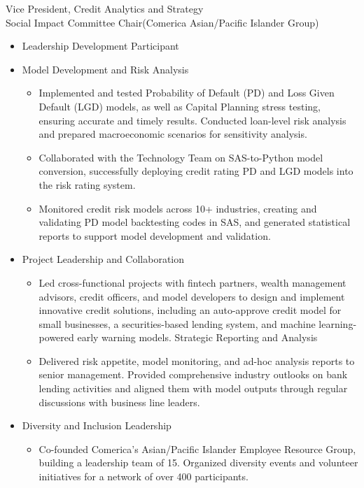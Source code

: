 \documentclass{resume}
\begin{document}
Vice President, Credit Analytics and Strategy\\
Social Impact Committee Chair(Comerica Asian/Pacific Islander Group)
\begin{itemize}

\item Leadership Development Participant
  
\item Model Development and Risk Analysis
  \begin{itemize}
\item Implemented and tested Probability of Default (PD) and Loss Given Default (LGD) models, as well as Capital Planning stress testing, ensuring accurate and timely results. Conducted loan-level risk analysis and prepared macroeconomic scenarios for sensitivity analysis.
\item Collaborated with the Technology Team on SAS-to-Python model conversion, successfully deploying credit rating PD and LGD models into the risk rating system.
\item Monitored credit risk models across 10+ industries, creating and validating PD model backtesting codes in SAS, and generated statistical reports to support model development and validation.
  \end{itemize}
  
\item Project Leadership and Collaboration
  \begin{itemize}
\item Led cross-functional projects with fintech partners, wealth management advisors, credit officers, and model developers to design and implement innovative credit solutions, including an auto-approve credit model for small businesses, a securities-based lending system, and machine learning-powered early warning models.
Strategic Reporting and Analysis
\item Delivered risk appetite, model monitoring, and ad-hoc analysis reports to senior management. Provided comprehensive industry outlooks on bank lending activities and aligned them with model outputs through regular discussions with business line leaders.
  \end{itemize}
  
\item Diversity and Inclusion Leadership
  \begin{itemize}
\item Co-founded Comerica’s Asian/Pacific Islander Employee Resource Group, building a leadership team of 15. Organized diversity events and volunteer initiatives for a network of over 400 participants.
  \end{itemize}
  
\end{itemize}
\end{document}
